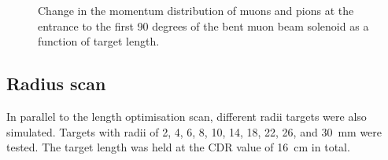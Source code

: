 \begin{figure}[t]
\centering
{}
\caption{
Change in the momentum distribution of muons and pions at the entrance to the first 90 degrees of the bent muon beam solenoid as a function of target length.
}
\end{figure}

\subsection{Radius scan}
In parallel to the length optimisation scan, different radii targets were also simulated.
Targets with radii of 2, 4, 6, 8, 10, 14, 18, 22, 26, and 30~mm were tested.
The target length was held at the \ac{CDR} value of 16~cm in total.

